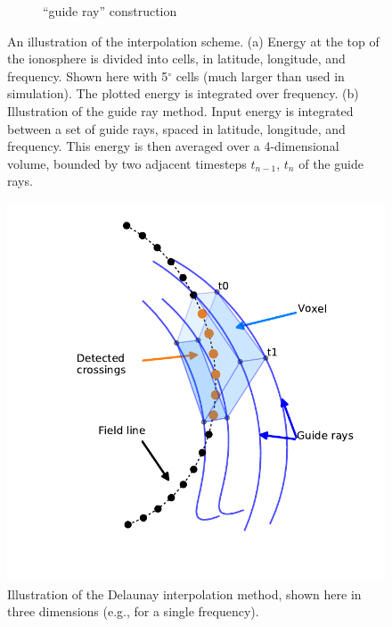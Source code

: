 \begin{figure}[h!]
\begin{subfigure}[t]{0.45\textwidth}
	\caption{``guide ray'' construction}
        \label{fig:guide_rays}
    \end{subfigure}
    \caption[Illustrations of the interpolation scheme]{An illustration of the interpolation scheme. (a) Energy at the top of the ionosphere is divided into cells, in latitude, longitude, and frequency. Shown here with 5$^\circ$ cells (much larger than used in simulation). The plotted energy is integrated over frequency. (b) Illustration of the guide ray method. Input energy is integrated between a set of guide rays, spaced in latitude, longitude, and frequency. This energy is then averaged over a 4-dimensional volume, bounded by two adjacent timesteps $t_{n-1}$, $t_n$ of the guide rays.}
    \label{fig:interpolation_scheme}
\end{figure}


\begin{figure}[h!]
\begin{center}
\includegraphics{figures/delaunay_1.pdf}
\caption[Delaunay interpolation method]{Illustration of the Delaunay interpolation method, shown here in three dimensions (e.g., for a single frequency).}
\label{fig:delaunay_1}
\end{center}
\end{figure}

